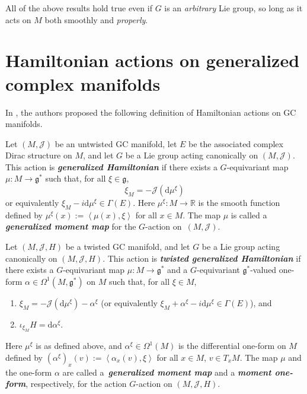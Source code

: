 \documentclass[pdftex]{sigma}
\numberwithin{equation}{section}
\newcommand{\deff}[1]{\textbf{\emph{#1}}}
\newcommand{\func}[3]{#1 \colon #2 \to #3}
\newcommand{\tang}{T}
\newcommand{\iprod}[2]{\left\langle {#1} , {#2} \right\rangle}
\begin{document}
\begin{Remark}
All of the above results hold true even if $G$ is an \emph{arbitrary} Lie group, so long as it acts on $M$ both smoothly and \emph{properly}.
\end{Remark}


\section{Hamiltonian actions on generalized complex manifolds}\label{section3}


In \cite{lintolman}, the authors proposed the following def\/inition of Hamiltonian actions on GC manifolds.


\begin{Definition}
\label{genhamactiondef}

Let $(M,\mathcal{J})$ be an untwisted GC manifold, let $E$ be the associated complex Dirac structure on $M$, and let $G$ be a Lie group acting canonically on $(M,\mathcal{J})$.  This action is \deff{generalized Hamiltonian} if there exists a $G$-equivariant map $\func{\mu}{M}{\mathfrak{g}^{\ast}}$ such that, for all $\xi \in \mathfrak{g}$,
\[
  \xi_M = - \mathcal{J} ( \mathrm{d} \mu^{\xi} )
\]
or equivalently $\xi_M - i \mathrm{d} \mu^{\xi} \in \Gamma(E)$.
Here $\func{\mu^{\xi}}{M}{\mathbb{R}}$ is the smooth function def\/ined by $\mu^{\xi}(x) := \iprod{\mu(x)}{\xi}$ for all $x \in M$.  The map $\mu$ is called a \deff{generalized moment map} for the $G$-action on~$(M, \mathcal{J})$.



Let $(M,\mathcal{J},H)$ be a twisted GC manifold, and let $G$ be a Lie group acting canonically on $(M,\mathcal{J},H)$.  This action is \deff{twisted generalized Hamiltonian} if there exists a $G$-equivariant map $\func{\mu}{M}{\mathfrak{g}^{\ast}}$ and a $G$-equivariant $\mathfrak{g}^*$-valued one-form $\alpha \in \Omega^1(M, \mathfrak{g}^{\ast})$ on $M$ such that, for all $\xi \in M$,
\begin{enumerate}\itemsep=0pt
  \item $\xi_M = - \mathcal{J} ( \mathrm{d} \mu^{\xi} ) - \alpha^{\xi}$ (or equivalently $\xi_M + \alpha^{\xi} - i \mathrm{d} \mu^{\xi} \in \Gamma(E)$), and
  \item $\iota_{\xi_M} H = \mathrm{d} \alpha^{\xi}$.
\end{enumerate}
Here $\mu^{\xi}$ is as def\/ined above, and $\alpha^{\xi} \in \Omega^1(M)$ is the dif\/ferential one-form on $M$ def\/ined by $(\alpha^{\xi})_x (v) := \iprod{\alpha_x(v)}{\xi}$ for all $x \in M$, $v \in \tang_x M$.  The map $\mu$ and the one-form $\alpha$ are called a~\deff{generalized moment map} and a \deff{moment one-form}, respectively, for the action $G$-action on $(M, \mathcal{J}, H)$.
\end{Definition}
\end{document}
